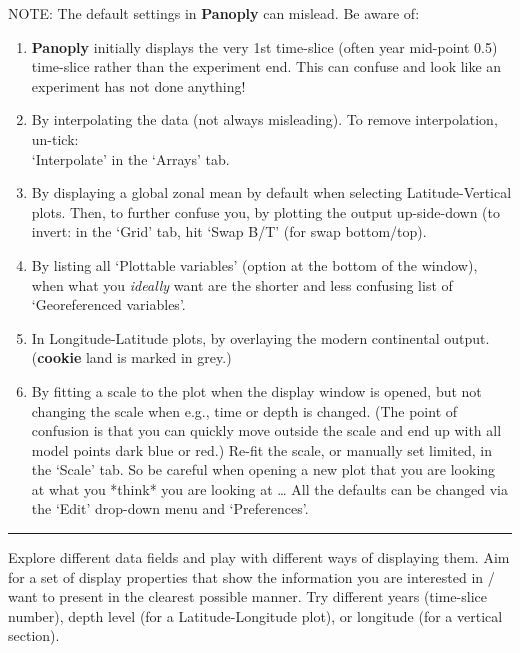 \vspace{1mm}
NOTE: The default settings in \textbf{Panoply} can mislead. Be aware of:
\vspace{1mm}
\begin{enumerate}
\item \textbf{Panoply} initially displays the very 1st time-slice (often year mid-point 0.5) time-slice rather than the experiment end. This can confuse and look like an experiment has not done anything!
\item By interpolating the data (not always misleading). To remove interpolation, un-tick:
\\‘\textsf{\footnotesize Interpolate}’ in the ‘\textsf{\footnotesize Arrays}’ tab.
\item By displaying a global zonal mean by default when selecting \textsf{\footnotesize Latitude-Vertical} plots. Then, to further confuse you, by plotting the output up-side-down (to invert: in the ‘\textsf{\footnotesize Grid}’ tab, hit ‘\textsf{\footnotesize Swap B/T}’ (for swap bottom/top).
\item By listing all ‘\textsf{\footnotesize Plottable variables}’ (option at the bottom of the window), when what you \textit{ideally} want are  the shorter and less confusing list of ‘\textsf{\footnotesize Georeferenced variables}’.
\item In \textsf{\footnotesize Longitude-Latitude} plots, by overlaying the modern continental output. (\textbf{cookie} land is marked in grey.)
\item By fitting a scale to the plot when the display window is opened, but not changing the scale when e.g., time or depth is changed. (The point of confusion is that you can quickly move outside the scale and end up with all model points dark blue or red.) Re-fit the scale, or manually set limited, in the ‘\textsf{\footnotesize Scale}’ tab.
So be careful when opening a new plot that you are looking at what you *think* you are looking at …
All the defaults can be changed via the ‘\textsf{\footnotesize Edit}’ drop-down menu and ‘\textsf{\footnotesize Preferences}’.
\end{enumerate}

\vspace{1mm}
\noindent\rule{4cm}{0.1mm}
\vspace{2mm}

\noindent Explore different data fields and play with different ways of displaying them. Aim for a set of display properties that show the information you are interested in / want to present in the clearest possible manner. Try different years (time-slice number), depth level (for a Latitude-Longitude plot), or longitude (for a vertical section).

